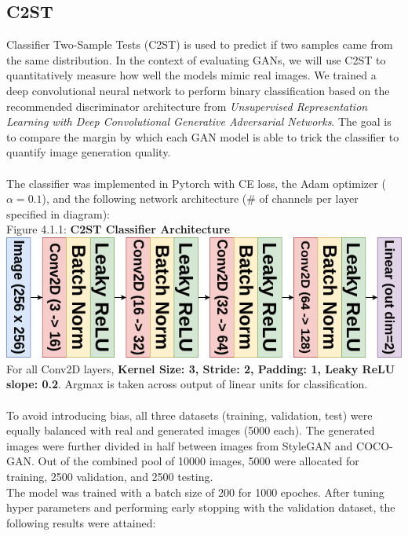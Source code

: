 \documentclass[10pt]{article}
\begin{document}
\begin{multicols*}{2}
        \subsection{C2ST}
        \label{subsec:c2st}
        Classifier Two-Sample Tests (C2ST) is used to predict if two samples came from the same distribution\cite{c2st}.
        In the context of evaluating GANs, we will use C2ST to quantitatively measure how well the models mimic real images.
        We trained a deep convolutional neural network to perform binary classification based on the recommended discriminator architecture from \textit{Unsupervised Representation Learning
with Deep Convolutional Generative Adversarial Networks}\cite{dcgan}.
        The goal is to compare the margin by which each GAN model is able to trick the classifier to quantify image generation quality.
        \\\\
        The classifier was implemented in Pytorch with CE loss, the Adam optimizer ($\alpha=0.1$), and the following network architecture (\# of channels per layer specified in diagram):\\
        Figure 4.1.1: \textbf{C2ST Classifier Architecture}\\
        \includegraphics[scale=0.4]{c2st-diagram.png}\\
        For all Conv2D layers, \textbf{Kernel Size: 3, Stride: 2, Padding: 1, Leaky ReLU slope: 0.2}.
        Argmax is taken across output of linear units for classification.
        \\\\
        To avoid introducing bias, all three datasets (training, validation, test) were equally balanced with real and generated images (5000 each).
        The generated images were further divided in half between images from StyleGAN and COCO-GAN.
        Out of the combined pool of 10000 images, 5000 were allocated for training, 2500 validation, and 2500 testing.
        \\
        The model was trained with a batch size of 200 for 1000 epoches.
        After tuning hyper parameters and performing early stopping with the validation dataset, the following results were attained:\\


\end{multicols*}
\end{document}
